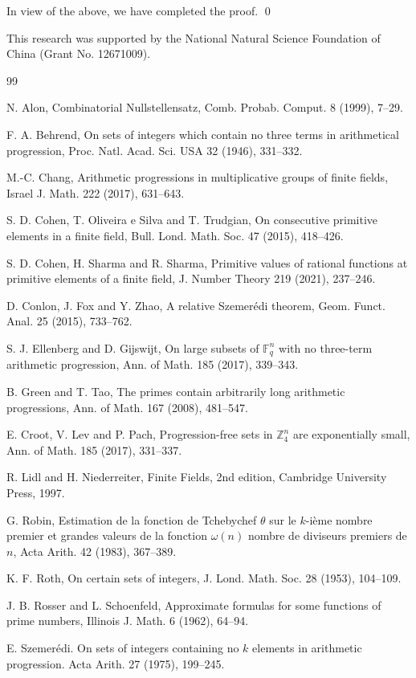 \documentclass[12pt]{amsart}
\def\Ack{\medskip\noindent {\bf Acknowledgments}}
\theoremstyle{plain}
\theoremstyle{remark}
\begin{document}
	In view of the above, we have completed the proof. \qed 
	
   \Ack\quad This research was supported by the National Natural Science Foundation of China (Grant No. 12671009).
	
	
	
	\begin{thebibliography}{99}
		
	 N. Alon, Combinatorial Nullstellensatz, Comb. Probab. Comput. 8 (1999), 7--29.
		
	 F. A. Behrend, On sets of integers which contain no three terms in arithmetical progression, Proc. Natl. Acad. Sci. USA 32 (1946), 331--332.
		
	 M.-C. Chang, Arithmetic progressions in multiplicative groups of finite fields, Israel J. Math. 222 (2017), 631--643.
		
	 S. D. Cohen, T. Oliveira e Silva and T. Trudgian, On consecutive primitive elements in a finite field, Bull. Lond. Math. Soc. 47 (2015), 418--426.
	
	 S. D. Cohen, H. Sharma and R. Sharma, Primitive values of rational functions at primitive elements of a finite field, J. Number Theory 219 (2021), 237--246.
		
	 D. Conlon, J. Fox and Y. Zhao, A relative Szemer\'edi theorem, Geom. Funct. Anal. 25 (2015), 733--762.
	
	 S. J. Ellenberg and D. Gĳswĳt, On large subsets of $\mathbb{F}_q^n$ with no three-term arithmetic progression, Ann. of Math. 185 (2017), 339--343.
	
	 B. Green and T. Tao, The primes contain arbitrarily long arithmetic progressions, Ann. of Math. 167 (2008), 481--547.
	
	 E. Croot, V. Lev and P. Pach, Progression-free sets in $\mathbb{Z}_4^n$ are exponentially small, Ann. of Math. 185 (2017), 331--337.
	
	 R. Lidl and H. Niederreiter, Finite Fields, 2nd edition, Cambridge University Press, 1997.
	
	 G. Robin, Estimation de la fonction de Tchebychef $\theta$ sur le $k$-i\`eme nombre premier et grandes valeurs de
	la fonction $\omega(n)$ nombre de diviseurs premiers de $n$, Acta Arith. 42 (1983), 367--389.
		
	 K. F. Roth, On certain sets of integers, J. Lond. Math. Soc. 28 (1953), 104--109.
	
	 J. B. Rosser and L. Schoenfeld, Approximate formulas for some functions of prime numbers, Illinois J. Math. 6 (1962), 64--94.
	
	 E. Szemer\'edi. On sets of integers containing no $k$ elements in arithmetic progression. Acta Arith. 27 (1975), 199--245.
	
	
	
	\end{thebibliography}
	
\end{document}

